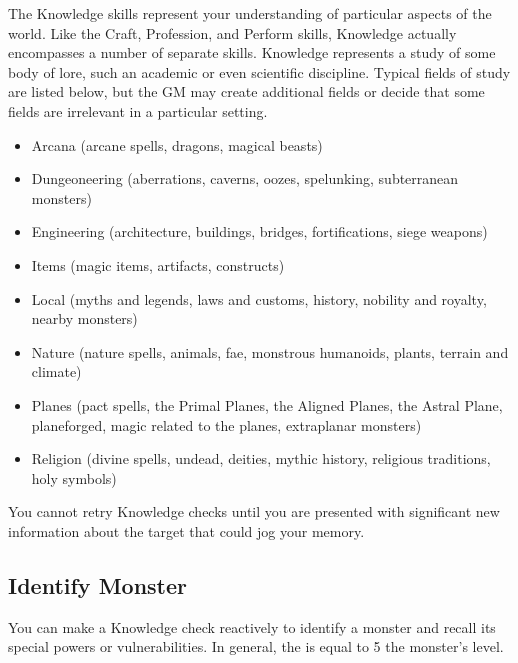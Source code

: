 \newpage
{}
    The Knowledge skills represent your understanding of particular aspects of the world.
    Like the Craft, Profession, and Perform skills, Knowledge actually encompasses a number of separate skills.
    Knowledge represents a study of some body of lore, such an academic or even scientific discipline.
    Typical fields of study are listed below, but the GM may create additional fields or decide that some fields are irrelevant in a particular setting.
        \begin{itemize}
            \item Arcana (arcane spells, dragons, magical beasts)
            \item Dungeoneering (aberrations, caverns, oozes, spelunking, subterranean monsters)
            \item Engineering (architecture, buildings, bridges, fortifications, siege weapons)
            \item Items (magic items, artifacts, constructs)
            \item Local (myths and legends, laws and customs, history, nobility and royalty, nearby monsters)
            \item Nature (nature spells, animals, fae, monstrous humanoids, plants, terrain and climate)
            \item Planes (pact spells, the Primal Planes, the Aligned Planes, the Astral Plane,
                planeforged, magic related to the planes, extraplanar monsters)
            \item Religion (divine spells, undead, deities, mythic history, religious traditions, holy symbols)
        \end{itemize}

        You cannot retry Knowledge checks until you are presented with significant new information about the target that could jog your memory.

    \subsection{Identify Monster}
        You can make a Knowledge check reactively to identify a monster and recall its special powers or vulnerabilities.
        In general, the  is equal to 5 \add the monster's level.

